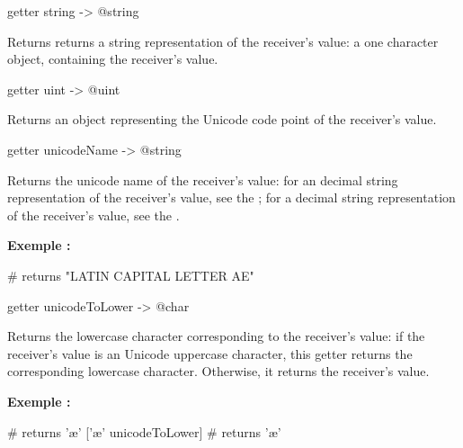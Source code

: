 
\begin{galgascode}
getter string -> @string
\end{galgascode}

Returns returns a string representation of the receiver's value: a one character  object, containing the receiver's value.





\begin{galgascode}
getter uint -> @uint
\end{galgascode}

Returns an  object representing the Unicode code point of the receiver's value.





\begin{galgascode}
getter unicodeName -> @string
\end{galgascode}

Returns the unicode name of the receiver's value: for an decimal string representation of the receiver's value, see the ; for a decimal string representation of the receiver's value, see the .

\textbf{Exemple :}
\begin{galgascode}
['\AE' unicodeName] # returns "LATIN CAPITAL LETTER AE"
\end{galgascode}





\begin{galgascode}
getter unicodeToLower -> @char
\end{galgascode}

Returns the lowercase character corresponding to the receiver's value: if the receiver's value is an Unicode uppercase character, this getter returns the corresponding lowercase character. Otherwise, it returns the receiver's value.

\textbf{Exemple :}
\begin{galgascode}
['Æ' unicodeToLower] # returns 'æ'
['æ' unicodeToLower] # returns 'æ'
\end{galgascode}





